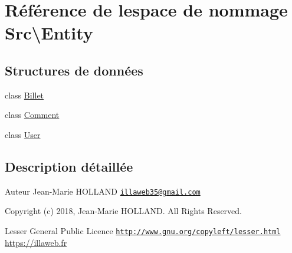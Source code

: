 \hypertarget{namespace_src_1_1_entity}{}\section{Référence de l\textquotesingle{}espace de nommage Src\textbackslash{}Entity}
\label{namespace_src_1_1_entity}
\subsection*{Structures de données}
\begin{DoxyCompactItemize}
\item 
class \hyperlink{class_src_1_1_entity_1_1_billet}{Billet}
\item 
class \hyperlink{class_src_1_1_entity_1_1_comment}{Comment}
\item 
class \hyperlink{class_src_1_1_entity_1_1_user}{User}
\end{DoxyCompactItemize}


\subsection{Description détaillée}
\begin{DoxyAuthor}{Auteur}
Jean-\/\+Marie H\+O\+L\+L\+A\+ND \href{mailto:illaweb35@gmail.com}{\tt illaweb35@gmail.\+com} 
\end{DoxyAuthor}
\begin{DoxyCopyright}{Copyright}
(c) 2018, Jean-\/\+Marie H\+O\+L\+L\+A\+ND. All Rights Reserved.
\end{DoxyCopyright}
Lesser General Public Licence \href{http://www.gnu.org/copyleft/lesser.html}{\tt http\+://www.\+gnu.\+org/copyleft/lesser.\+html} \hyperlink{}{https\+://illaweb.\+fr}